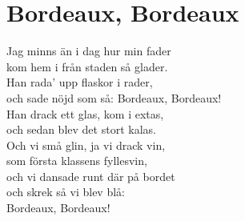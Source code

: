 \section{Bordeaux, Bordeaux}
Jag minns än i dag hur min fader\\
kom hem i från staden så glader.\\
Han rada' upp flaskor i rader,\\
och sade nöjd som så: Bordeaux, Bordeaux!\\
Han drack ett glas, kom i extas,\\
och sedan blev det stort kalas.\\
Och vi små glin, ja vi drack vin,\\
som första klassens fyllesvin,\\
och vi dansade runt där på bordet\\
och skrek så vi blev blå:\\
Bordeaux, Bordeaux!\\